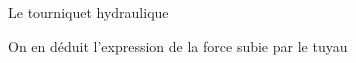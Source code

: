 \begin{exo}[PC][3][TD]{Le tourniquet hydraulique}
\begin{quest}
{$$	$$
	On en déduit l'expression de la force subie par le tuyau
	}
\end{quest}


\end{exo}
